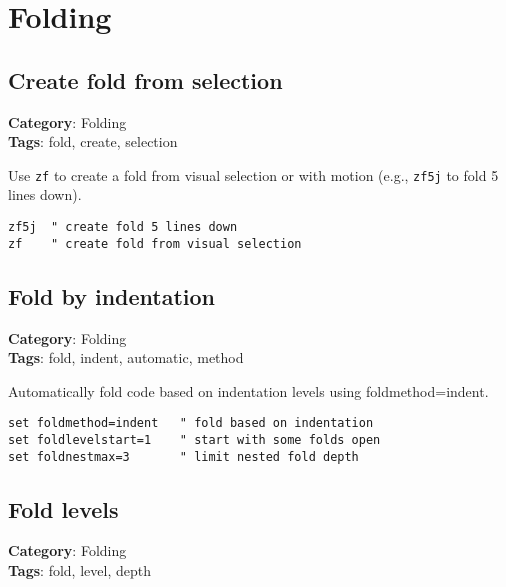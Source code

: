 {{{{{{\chapter{Folding}
\section{Create fold from selection}

\textbf{Category}: Folding\\ \textbf{Tags}: fold, create, selection
\vspace{0.5cm}

Use {\footnotesize \Verb§zf§} to create a fold from visual selection or with motion (e.g., {\footnotesize \Verb§zf5j§} to fold 5 lines down).

\begin{Exa*}{}
\begin{Verbatim}[fontsize=\footnotesize, breaklines, breakanywhere]
zf5j  " create fold 5 lines down
zf    " create fold from visual selection
\end{Verbatim}
\end{Exa*}

\section{Fold by indentation}

\textbf{Category}: Folding\\ \textbf{Tags}: fold, indent, automatic, method
\vspace{0.5cm}

Automatically fold code based on indentation levels using foldmethod=indent.

\begin{Exa*}{}
\begin{Verbatim}[fontsize=\footnotesize, breaklines, breakanywhere]
set foldmethod=indent   " fold based on indentation
set foldlevelstart=1    " start with some folds open
set foldnestmax=3       " limit nested fold depth
\end{Verbatim}
\end{Exa*}

\section{Fold levels}

\textbf{Category}: Folding\\ \textbf{Tags}: fold, level, depth
\vspace{0.5cm}

}}}}}}
